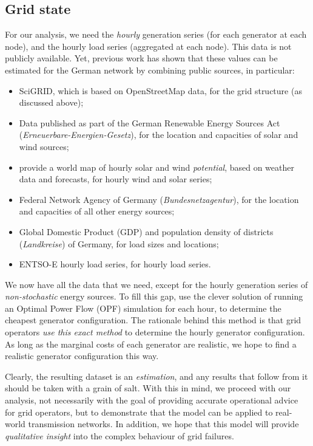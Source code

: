 \documentclass[main.tex]{subfiles}
\begin{document}
\subsection{Grid state}
For our analysis, we need the \emph{hourly} generation series (for each generator at each node), and the hourly load series (aggregated at each node). This data is not publicly available. Yet, previous work \citep{PyPSA} has shown that these values can be estimated for the German network by combining public sources, in particular:
\begin{itemize}
\item SciGRID, which is based on OpenStreetMap data, for the grid structure (as discussed above);
\item Data published as part of the German Renewable Energy Sources Act (\emph{Erneuerbare-Energien-Gesetz}), for the location and capacities of solar and wind sources;
\item \cite{Andresen2015} provide a world map of hourly solar and wind \emph{potential}, based on weather data and forecasts, for hourly wind and solar series;
\item Federal Network Agency of Germany (\emph{Bundesnetzagentur}), for the location and capacities of all other energy sources;
\item Global Domestic Product (GDP) and population density of districts (\emph{Landkreise}) of Germany, for load sizes and locations;
\item ENTSO-E hourly load series, for hourly load series.
\end{itemize}
We now have all the data that we need, except for the hourly generation series of \emph{non-stochastic} energy sources. To fill this gap, \cite{PyPSA} use the clever solution of running an Optimal Power Flow (OPF) simulation for each hour, to determine the cheapest generator configuration. The rationale behind this method is that grid operators \emph{use this exact method} to determine the hourly generator configuration. As long as the marginal costs of each generator are realistic, we hope to find a realistic generator configuration this way.

Clearly, the resulting dataset is an \emph{estimation}, and any results that follow from it should be taken with a grain of salt. With this in mind, we proceed with our analysis, not necessarily with the goal of providing accurate operational advice for grid operators, but to demonstrate that the model can be applied to real-world transmission networks. In addition, we hope that this model will provide \emph{qualitative insight} into the complex behaviour of grid failures.
\end{document}
